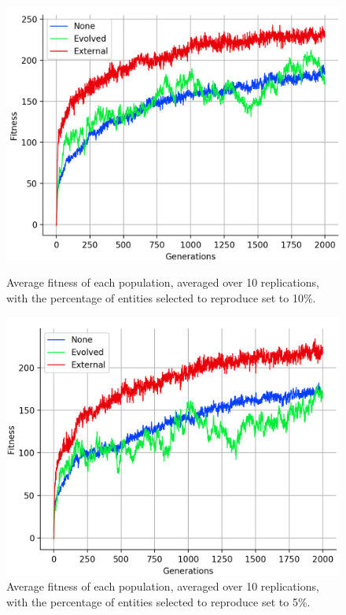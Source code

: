 \documentclass[12pt,a4paper]{report}
\begin{document}
\begin{figure}[ht]
   \centering
   \begin{minipage}{0.49\textwidth}
          \centering
          \captionsetup{width=.9\linewidth}
          \includegraphics[width=1.\linewidth]{results/average-keep10.png}
          \caption{Average fitness of each population, averaged over 10 replications, with the percentage of entities selected to reproduce set to 10\%.}
          \label{fig:average-keep10}
   \end{minipage}
   \begin{minipage}{0.49\textwidth}
          \centering
          \captionsetup{width=.9\linewidth}
          \includegraphics[width=1.\linewidth]{results/average-keep05.png}
          \caption{Average fitness of each population, averaged over 10 replications, with the percentage of entities selected to reproduce set to 5\%.}
          \label{fig:average-keep05}
   \end{minipage}
\end{figure}
 
\end{document}
